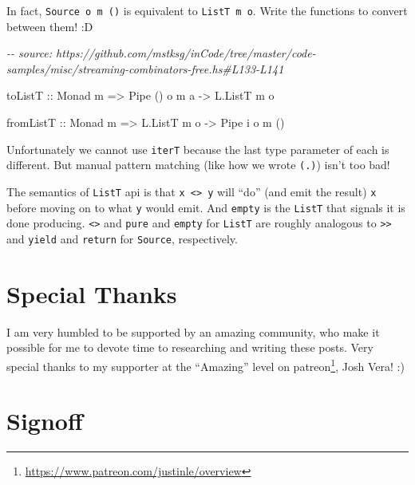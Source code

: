 \documentclass[]{article}
\newenvironment{Shaded}{}{}
\newcommand{\CommentTok}[1]{\textcolor[rgb]{0.38,0.63,0.69}{\textit{#1}}}
\newcommand{\DataTypeTok}[1]{\textcolor[rgb]{0.56,0.13,0.00}{#1}}
\newcommand{\NormalTok}[1]{#1}
\newcommand{\OtherTok}[1]{\textcolor[rgb]{0.00,0.44,0.13}{#1}}
\renewcommand{\href}[2]{#2\footnote{\url{#1}}}
\begin{document}
\begin{enumerate}
  In fact, \texttt{Source\ o\ m\ ()} is equivalent to \texttt{ListT\ m\ o}.
  Write the functions to convert between them! :D

\begin{Shaded}
\begin{Highlighting}[]
\CommentTok{{-}{-} source: https://github.com/mstksg/inCode/tree/master/code{-}samples/misc/streaming{-}combinators{-}free.hs\#L133{-}L141}

\OtherTok{toListT ::} \DataTypeTok{Monad}\NormalTok{ m }\OtherTok{=>} \DataTypeTok{Pipe}\NormalTok{ () o m a }\OtherTok{{-}>} \DataTypeTok{L.ListT}\NormalTok{ m o}

\OtherTok{fromListT ::} \DataTypeTok{Monad}\NormalTok{ m }\OtherTok{=>} \DataTypeTok{L.ListT}\NormalTok{ m o }\OtherTok{{-}>} \DataTypeTok{Pipe}\NormalTok{ i o m ()}
\end{Highlighting}
\end{Shaded}

  Unfortunately we cannot use \texttt{iterT} because the last type parameter of
  each is different. But manual pattern matching (like how we wrote
  \texttt{(.\textbar{})}) isn't too bad!

  The semantics of \texttt{ListT} api is that
  \texttt{x\ \textless{}\textbar{}\textgreater{}\ y} will ``do'' (and emit the
  result) \texttt{x} before moving on to what \texttt{y} would emit. And
  \texttt{empty} is the \texttt{ListT} that signals it is done producing.
  \texttt{\textless{}\textbar{}\textgreater{}} and \texttt{pure} and
  \texttt{empty} for \texttt{ListT} are roughly analogous to
  \texttt{\textgreater{}\textgreater{}} and \texttt{yield} and \texttt{return}
  for \texttt{Source}, respectively.
\end{enumerate}

\hypertarget{special-thanks}{%
\section{Special Thanks}\label{special-thanks}}

I am very humbled to be supported by an amazing community, who make it possible
for me to devote time to researching and writing these posts. Very special
thanks to my supporter at the ``Amazing'' level on
\href{https://www.patreon.com/justinle/overview}{patreon}, Josh Vera! :)

\hypertarget{signoff}{%
\section{Signoff}\label{signoff}}
\end{document}
